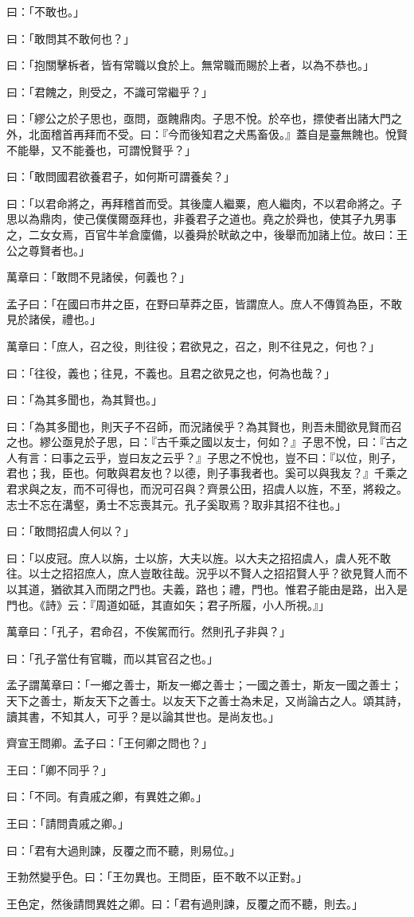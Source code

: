 \documentclass[12pt,a4paper]{ctexbook}
\begin{document}
曰：「不敢也。」\par
曰：「敢問其不敢何也？」\par
曰：「抱關擊柝者，皆有常職以食於上。無常職而賜於上者，以為不恭也。」\par
曰：「君餽之，則受之，不識可常繼乎？」\par
曰：「繆公之於子思也，亟問，亟餽鼎肉。子思不悅。於卒也，摽使者出諸大門之外，北面稽首再拜而不受。曰：『今而後知君之犬馬畜伋。』蓋自是臺無餽也。悅賢不能舉，又不能養也，可謂悅賢乎？」\par
曰：「敢問國君欲養君子，如何斯可謂養矣？」\par
曰：「以君命將之，再拜稽首而受。其後廩人繼粟，庖人繼肉，不以君命將之。子思以為鼎肉，使己僕僕爾亟拜也，非養君子之道也。堯之於舜也，使其子九男事之，二女女焉，百官牛羊倉廩備，以養舜於畎畝之中，後舉而加諸上位。故曰：王公之尊賢者也。」\par
萬章曰：「敢問不見諸侯，何義也？」\par
孟子曰：「在國曰市井之臣，在野曰草莽之臣，皆謂庶人。庶人不傳質為臣，不敢見於諸侯，禮也。」\par
萬章曰：「庶人，召之役，則往役；君欲見之，召之，則不往見之，何也？」\par
曰：「往役，義也；往見，不義也。且君之欲見之也，何為也哉？」\par
曰：「為其多聞也，為其賢也。」\par
曰：「為其多聞也，則天子不召師，而況諸侯乎？為其賢也，則吾未聞欲見賢而召之也。繆公亟見於子思，曰：『古千乘之國以友士，何如？』子思不悅，曰：『古之人有言：曰事之云乎，豈曰友之云乎？』子思之不悅也，豈不曰：『以位，則子，君也；我，臣也。何敢與君友也？以德，則子事我者也。奚可以與我友？』千乘之君求與之友，而不可得也，而況可召與？齊景公田，招虞人以旌，不至，將殺之。志士不忘在溝壑，勇士不忘喪其元。孔子奚取焉？取非其招不往也。」\par
曰：「敢問招虞人何以？」\par
曰：「以皮冠。庶人以旃，士以旂，大夫以旌。以大夫之招招虞人，虞人死不敢往。以士之招招庶人，庶人豈敢往哉。況乎以不賢人之招招賢人乎？欲見賢人而不以其道，猶欲其入而閉之門也。夫義，路也；禮，門也。惟君子能由是路，出入是門也。《詩》云：『周道如砥，其直如矢；君子所履，小人所視。』」\par
萬章曰：「孔子，君命召，不俟駕而行。然則孔子非與？」\par
曰：「孔子當仕有官職，而以其官召之也。」\par
孟子謂萬章曰：「一鄉之善士，斯友一鄉之善士；一國之善士，斯友一國之善士；天下之善士，斯友天下之善士。以友天下之善士為未足，又尚論古之人。頌其詩，讀其書，不知其人，可乎？是以論其世也。是尚友也。」\par
齊宣王問卿。孟子曰：「王何卿之問也？」\par
王曰：「卿不同乎？」\par
曰：「不同。有貴戚之卿，有異姓之卿。」\par
王曰：「請問貴戚之卿。」\par
曰：「君有大過則諫，反覆之而不聽，則易位。」\par
王勃然變乎色。曰：「王勿異也。王問臣，臣不敢不以正對。」\par
王色定，然後請問異姓之卿。曰：「君有過則諫，反覆之而不聽，則去。」\par
\end{document}

